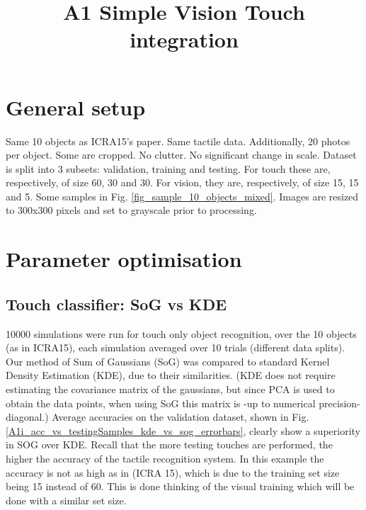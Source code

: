 \documentclass[]{article}
\title{A1 Simple Vision Touch integration}
\author{}
\begin{document}
\maketitle

\begin{abstract}

\end{abstract}

\section{General setup}
Same 10 objects as ICRA15's paper. Same tactile data. Additionally, 20 photos per object. Some are cropped. No clutter. No significant change in scale.
Dataset is split into 3 subsets: validation, training and testing. For touch these are, respectively, of size 60, 30 and 30. For vision, they are, respectively, of size 15, 15 and 5.
Some samples in Fig. \ref{fig_sample_10_objects_mixed}. Images are resized to 300x300 pixels and set to grayscale prior to processing.

\begin{figure}
\centering
{}
\end{figure}



\section{Parameter optimisation}

\subsection{Touch classifier: SoG vs KDE}

10000 simulations were run for touch only object recognition, over the 10 objects (as in ICRA15), each simulation averaged over 10 trials (different data splits). Our method of Sum of Gaussians (SoG) was compared to standard Kernel Density Estimation (KDE), due to their similarities. (KDE does not require estimating the covariance matrix of the gaussians, but since PCA is used to obtain the data points, when using SoG this matrix is -up to numerical precision- diagonal.) 
Average accuracies on the validation dataset, shown in Fig. \ref{A1i_acc_vs_testingSamples_kde_vs_sog_errorbars}, clearly show a superiority in SOG over KDE.
Recall that the more testing touches are performed, the higher the accuracy of the tactile recognition system. In this example the accuracy is not as high as in (ICRA 15), which is due to the training set size being 15 instead of 60. This is done thinking of the visual training which will be done with a similar set size.
\end{document}

